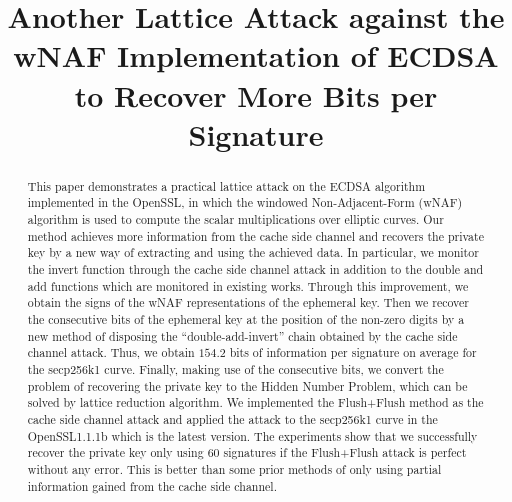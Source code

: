 \documentclass[runningheads]{llncs}
\begin{document}
%
\title{Another Lattice Attack against the wNAF Implementation of ECDSA to Recover More Bits per Signature}
%
%
\maketitle              %
%
\begin{abstract}
This paper demonstrates a practical lattice attack on the ECDSA algorithm implemented in the OpenSSL, in which the windowed Non-Adjacent-Form (wNAF) algorithm is used to compute the scalar multiplications over elliptic curves.
Our method achieves more information from the cache side channel and
    recovers the private key by a new way of extracting and using the achieved data.
In particular, we monitor the invert function through the cache side channel attack
    in addition to the double and add functions which are monitored in existing works.
 Through this improvement, we obtain the signs of the wNAF representations of the ephemeral key.
Then we recover the consecutive bits of the ephemeral key at the position of the non-zero digits by a new method of disposing the ``double-add-invert'' chain obtained by the cache side channel attack.
Thus, we obtain $154.2$ bits of information per signature on average for the secp256k1 curve.
Finally, making use of the consecutive bits,
 we convert the problem of recovering the private key to the Hidden Number Problem,
 which can be solved by lattice reduction algorithm.
We implemented the Flush+Flush method as the cache side channel attack and applied the attack to the secp256k1 curve in the OpenSSL1.1.1b which is the latest version.
The experiments show that we successfully recover the private key only using $60$ signatures if the Flush+Flush attack is perfect without any error.
This is better than some prior methods of only using partial information gained from the cache side channel.

\end{abstract}
%
%
%
\end{document}
